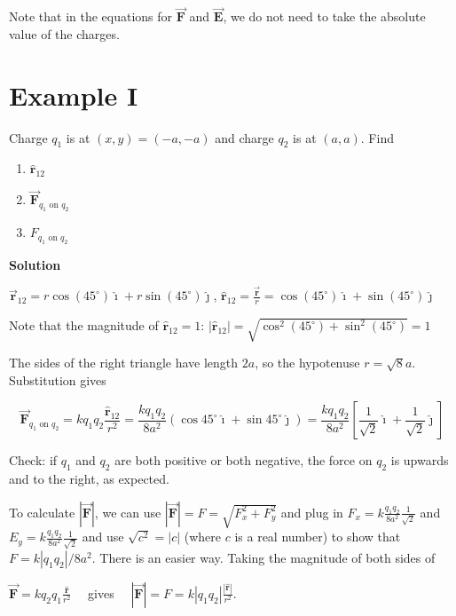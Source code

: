 \documentclass{article}
\newcommand{\ds}[0]{\displaystyle}
\newcommand{\ihat}[0]{\hat{\boldsymbol{\imath}}}
\newcommand{\jhat}[0]{\hat{\boldsymbol{\jmath}}}
\newcommand{\rhat}[0]{\hat{\mathbf{r}}}
\newcommand{\bfvec}[1]{\vec{\mathbf{#1}}}
\begin{document}
Note that in the equations for $\bfvec{F}$ and $\bfvec{E}$, we do not need to take the absolute value of the charges.

\newpage

\section{Example I}

Charge $q_1$ is at $(x,y)=(-a,-a)$ and charge $q_2$ is at $(a, a)$. Find

\begin{enumerate}

  \item $\rhat_{12}$

  \item $\bfvec{F}_{q_1\text{ on }q_2}$

  \item $F_{q_1\text{ on }q_2}$

\end{enumerate}

\textbf{Solution}



$\bfvec{r}_{12}=r\cos(45^\circ)\ihat + r\sin(45^\circ)\jhat$, $\ds\rhat_{12}=\frac{\bfvec{r}}{r}=\cos(45^\circ)\ihat +\sin(45^\circ)\jhat$

Note that the magnitude of $\rhat_{12}=1$: $|\rhat_{12}|=\sqrt{\cos^2(45^\circ)+\sin^2(45^\circ)}=1$

The sides of the right triangle have length $2a$, so the hypotenuse $r=\sqrt{8}a$. Substitution gives

$$\bfvec{F}_{q_1\text{ on }q_2}=kq_1q_2\frac{\rhat_{12}}{r^2} = \frac{kq_1q_2}{8a^2}(\cos 45^\circ \ihat + \sin 45^\circ \jhat) =\frac{kq_1q_2}{8a^2}\left[\frac{1}{\sqrt{2}}\ihat + \frac{1}{\sqrt{2}}\jhat\right]$$

Check: if $q_1$ and $q_2$ are both positive or both negative, the force on $q_2$ is upwards and to the right, as expected.

To calculate $|\bfvec{F}|$, we can use $|\bfvec{F}|=F=\sqrt{F_x^2+F_y^2}$ and plug in $F_x=k\frac{q_1q_2}{8a^2}\frac{1}{\sqrt{2}}$ and $E_y=k\frac{q_1q_2}{8a^2}\frac{1}{\sqrt{2}}$ and use $\sqrt{c^2}=|c|$ (where $c$ is a real number) to show that $F=k|q_1q_2|/{8a^2}$. There is an easier way. Taking the magnitude of both sides of

$\ds\bfvec{F}=kq_2q_1\frac{\rhat}{r^2}\quad$
gives
$\quad\ds|\bfvec{F}|=F=k|q_1q_2|\frac{|\rhat|}{r^2}$.
\end{document}
